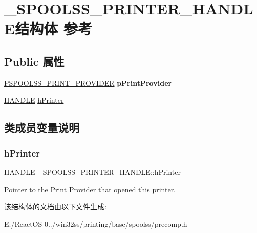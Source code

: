 \hypertarget{struct___s_p_o_o_l_s_s___p_r_i_n_t_e_r___h_a_n_d_l_e}{}\section{\+\_\+\+S\+P\+O\+O\+L\+S\+S\+\_\+\+P\+R\+I\+N\+T\+E\+R\+\_\+\+H\+A\+N\+D\+L\+E结构体 参考}
\label{struct___s_p_o_o_l_s_s___p_r_i_n_t_e_r___h_a_n_d_l_e}
\subsection*{Public 属性}
\begin{DoxyCompactItemize}
\item 
\mbox{\label{struct___s_p_o_o_l_s_s___p_r_i_n_t_e_r___h_a_n_d_l_e_aace5b6619aafb60a29f5810af8f55729}} 
\hyperlink{struct___s_p_o_o_l_s_s___p_r_i_n_t___p_r_o_v_i_d_e_r}{P\+S\+P\+O\+O\+L\+S\+S\+\_\+\+P\+R\+I\+N\+T\+\_\+\+P\+R\+O\+V\+I\+D\+ER} {\bfseries p\+Print\+Provider}
\item 
\hyperlink{interfacevoid}{H\+A\+N\+D\+LE} \hyperlink{struct___s_p_o_o_l_s_s___p_r_i_n_t_e_r___h_a_n_d_l_e_ae3650180b7bedd8b0cc75861147178fa}{h\+Printer}
\end{DoxyCompactItemize}


\subsection{类成员变量说明}
\mbox{\label{struct___s_p_o_o_l_s_s___p_r_i_n_t_e_r___h_a_n_d_l_e_ae3650180b7bedd8b0cc75861147178fa}} 
\subsubsection{\texorpdfstring{h\+Printer}{hPrinter}}
{\footnotesize\ttfamily \hyperlink{interfacevoid}{H\+A\+N\+D\+LE} \+\_\+\+S\+P\+O\+O\+L\+S\+S\+\_\+\+P\+R\+I\+N\+T\+E\+R\+\_\+\+H\+A\+N\+D\+L\+E\+::h\+Printer}

Pointer to the Print \hyperlink{class_provider}{Provider} that opened this printer. 

该结构体的文档由以下文件生成\+:\begin{DoxyCompactItemize}
\item 
E\+:/\+React\+O\+S-\/0../win32ss/printing/base/spoolss/precomp.\+h\end{DoxyCompactItemize}

